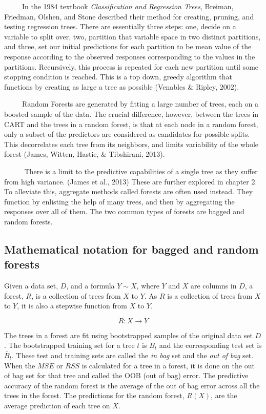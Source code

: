 \documentclass[12pt,twoside]{reedthesis}
\begin{document}
  ~~~~~In the 1984 textbook \emph{Classification and Regression Trees},
  Breiman, Friedman, Olshen, and Stone described their method for
  creating, pruning, and testing regression trees. There are essentially
  three steps: one, decide on a variable to split over, two, partition
  that variable space in two distinct partitions, and three, set our
  initial predictions for each partition to be mean value of the response
  according to the observed responses corresponding to the values in the
  partitions. Recursively, this process is repeated for each new partition
  until some stopping condition is reached. This is a top down, greedy
  algorithm that functions by creating as large a tree as possible
  (Venables \& Ripley, 2002).
  
  ~~~~~Random Forests are generated by fitting a large number of trees,
  each on a boosted sample of the data. The crucial difference, however,
  between the trees in CART and the trees in a random forest, is that at
  each node in a random forest, only a subset of the predictors are
  considered as candidates for possible splits. This decorrelates each
  tree from its neighbors, and limits variability of the whole forest
  (James, Witten, Hastie, \& Tibshirani, 2013).
  
  ~~~~~ There is a limit to the predictive capabilities of a single tree
  as they suffer from high variance. (James et al., 2013) These are
  further explored in chapter 2. To alleviate this, aggregate methods
  called forests are often used instead. They function by enlisting the
  help of many trees, and then by aggregating the responses over all of
  them. The two common types of forests are bagged and random forests.
  
  \subsection{Mathematical notation for bagged and random
  forests}\label{mathematical-notation-for-bagged-and-random-forests}
  
  Given a data set, \(D\), and a formula \(Y \sim X\), where \(Y\) and
  \(X\) are columns in \(D\), a forest, \(R\), is a collection of trees
  from \(X\) to \(Y\). As \(R\) is a collection of trees from \(X\) to
  \(Y\), it is also a stepwise function from \(X\) to \(Y\).
  
  \[R:X \rightarrow Y\]
  
  The trees in a forest are fit using bootstrapped samples of the original
  data set \(D\). The bootstrapped training set for a tree \(t\) is
  \(B_t\) and the corresponding test set is \(\bar{B}_t\). These test and
  training sets are called the \emph{in bag} set and the \emph{out of bag}
  set. When the \(MSE\) or \(RSS\) is calculated for a tree in a forest,
  it is done on the out of bag set for that tree and called the OOB (out
  of bag) error. The predictive accuracy of the random forest is the
  average of the out of bag error across all the trees in the forest. The
  predictions for the random forest, \(R(X)\), are the average prediction
  of each tree on \(X\).
  
\end{document}

